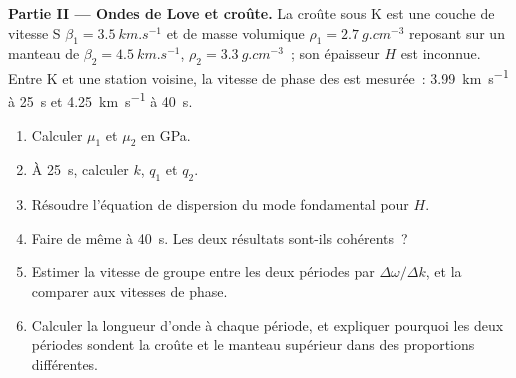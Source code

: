 \begin{problem}
\noindent\textbf{Partie II --- Ondes de Love et croûte.} La croûte sous K est une
couche de vitesse S $\beta_1 = \qty{3.5}{km.s^{-1}}$ et de masse volumique
$\rho_1 = \qty{2.7}{g.cm^{-3}}$ reposant sur un manteau de $\beta_2 =
\qty{4.5}{km.s^{-1}}$, $\rho_2 = \qty{3.3}{g.cm^{-3}}$~; son épaisseur $H$ est
inconnue. Entre K et une station voisine, la vitesse de phase des  est
mesurée~: \qty{3.99}{km.s^{-1}} à \qty{25}{s} et \qty{4.25}{km.s^{-1}} à
\qty{40}{s}.
\begin{enumerate}[resume]
  \item Calculer $\mu_1$ et $\mu_2$ en \unit{GPa}.
  \item À \qty{25}{s}, calculer $k$, $q_1$ et $q_2$.
  \item Résoudre l'équation de dispersion du mode fondamental pour $H$.
  \item Faire de même à \qty{40}{s}. Les deux résultats sont-ils cohérents~?
       \item Estimer la vitesse de groupe entre les deux périodes par
        $\Delta\omega/\Delta k$, et la comparer aux vitesses de phase.
  \item Calculer la longueur d'onde à chaque période, et expliquer pourquoi les deux
        périodes sondent la croûte et le manteau supérieur dans des
        proportions différentes.
\end{enumerate}


\end{problem}
